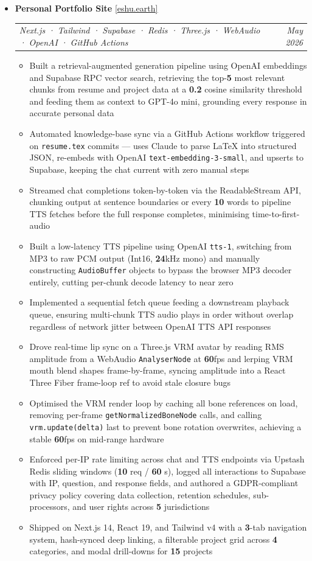 \documentclass[10pt,letterpaper]{article}
\makeatletter
\newcommand{\resumeProjectHeading}[5]{%
  \vspace{5pt}%
  \item[]%
    {\small \textbf{#1} \enspace \href{#5}{\textcolor{accentblue}{[\underline{#2}]}}}\\[2pt]%
    {\small \begin{tabular*}{0.99\textwidth}{l@{\extracolsep{\fill}}r}%
      \textcolor{midgray}{\textit{\hspace{2pt}#3}} & \textcolor{midgray}{\textit{#4}}%
    \end{tabular*}}%
  \vspace{3pt}%
}
\newcommand{\resumeItem}[1]{
  \item {\small #1}
}
\makeatother
\begin{document}
\begin{itemize}[leftmargin=0in, label={}]
    \resumeProjectHeading
  {Personal Portfolio Site}{eshu.earth}
  {Next.js · Tailwind · Supabase · Redis · Three.js · WebAudio · OpenAI · GitHub Actions}
  {May 2026}
  {https://www.eshu.earth}
\begin{itemize}
  \resumeItem{Built a retrieval-augmented generation pipeline using OpenAI embeddings and Supabase RPC vector search, retrieving the top-\textbf{5} most relevant chunks from resume and project data at a \textbf{0.2} cosine similarity threshold and feeding them as context to GPT-4o mini, grounding every response in accurate personal data}
  \resumeItem{Automated knowledge-base sync via a GitHub Actions workflow triggered on \texttt{resume.tex} commits — uses Claude to parse LaTeX into structured JSON, re-embeds with OpenAI \texttt{text-embedding-3-small}, and upserts to Supabase, keeping the chat current with zero manual steps}
  \resumeItem{Streamed chat completions token-by-token via the ReadableStream API, chunking output at sentence boundaries or every \textbf{10} words to pipeline TTS fetches before the full response completes, minimising time-to-first-audio}
  \resumeItem{Built a low-latency TTS pipeline using OpenAI \texttt{tts-1}, switching from MP3 to raw PCM output (Int16, \textbf{24}kHz mono) and manually constructing \texttt{AudioBuffer} objects to bypass the browser MP3 decoder entirely, cutting per-chunk decode latency to near zero}
  \resumeItem{Implemented a sequential fetch queue feeding a downstream playback queue, ensuring multi-chunk TTS audio plays in order without overlap regardless of network jitter between OpenAI TTS API responses}
  \resumeItem{Drove real-time lip sync on a Three.js VRM avatar by reading RMS amplitude from a WebAudio \texttt{AnalyserNode} at \textbf{60}fps and lerping VRM mouth blend shapes frame-by-frame, syncing amplitude into a React Three Fiber frame-loop ref to avoid stale closure bugs}
  \resumeItem{Optimised the VRM render loop by caching all bone references on load, removing per-frame \texttt{getNormalizedBoneNode} calls, and calling \texttt{vrm.update(delta)} last to prevent bone rotation overwrites, achieving a stable \textbf{60}fps on mid-range hardware}
  \resumeItem{Enforced per-IP rate limiting across chat and TTS endpoints via Upstash Redis sliding windows (\textbf{10} req / \textbf{60} s), logged all interactions to Supabase with IP, question, and response fields, and authored a GDPR-compliant privacy policy covering data collection, retention schedules, sub-processors, and user rights across \textbf{5} jurisdictions}
  \resumeItem{Shipped on Next.js 14, React 19, and Tailwind v4 with a \textbf{3}-tab navigation system, hash-synced deep linking, a filterable project grid across \textbf{4} categories, and modal drill-downs for \textbf{15} projects}
\end{itemize}


\end{itemize}
\end{document}
